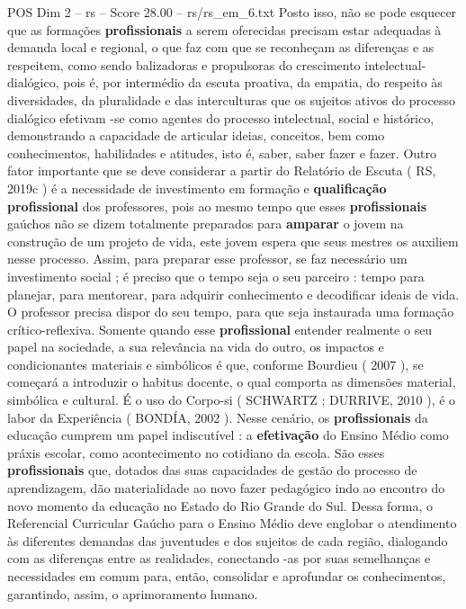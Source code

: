 \begin{textsample}{POS Dim 2 – rs – Score 28.00 – rs/rs\_em\_6.txt}
Posto isso, não se pode esquecer que as formações \textbf{profissionais} a serem oferecidas precisam estar adequadas à demanda local e regional, o que faz com que se reconheçam as diferenças e as respeitem, como sendo balizadoras e propulsoras do crescimento intelectual-dialógico, pois é, por intermédio da escuta proativa, da empatia, do respeito às diversidades, da pluralidade e das interculturas que os sujeitos ativos do processo dialógico efetivam -se como agentes do processo intelectual, social e histórico, demonstrando a capacidade de articular ideias, conceitos, bem como conhecimentos, habilidades e atitudes, isto é, saber, saber fazer e fazer.
Outro fator importante que se deve considerar a partir do Relatório de Escuta ( RS, 2019c ) é a necessidade de investimento em formação e \textbf{qualificação} \textbf{profissional} dos professores, pois ao mesmo tempo que esses \textbf{profissionais} gaúchos não se dizem totalmente preparados para \textbf{amparar} o jovem na construção de um projeto de vida, este jovem espera que seus mestres os auxiliem nesse processo.
Assim, para preparar esse professor, se faz necessário um investimento social ; é preciso que o tempo seja o seu parceiro : tempo para planejar, para mentorear, para adquirir conhecimento e decodificar ideais de vida.
O professor precisa dispor do seu tempo, para que seja instaurada uma formação crítico-reflexiva.
Somente quando esse \textbf{profissional} entender realmente o seu papel na sociedade, a sua relevância na vida do outro, os impactos e condicionantes materiais e simbólicos é que, conforme Bourdieu ( 2007 ), se começará a introduzir o habitus docente, o qual comporta as dimensões material, simbólica e cultural.
É o uso do Corpo-si ( SCHWARTZ ; DURRIVE, 2010 ), é o labor da Experiência ( BONDÍA, 2002 ).
Nesse cenário, os \textbf{profissionais} da educação cumprem um papel indiscutível : a \textbf{efetivação} do Ensino Médio como práxis escolar, como acontecimento no cotidiano da escola.
São esses \textbf{profissionais} que, dotados das suas capacidades de gestão do processo de aprendizagem, dão materialidade ao novo fazer pedagógico indo ao encontro do novo momento da educação no Estado do Rio Grande do Sul.
Dessa forma, o Referencial Curricular Gaúcho para o Ensino Médio deve englobar o atendimento às diferentes demandas das juventudes e dos sujeitos de cada região, dialogando com as diferenças entre as realidades, conectando -as por suas semelhanças e necessidades em comum para, então, consolidar e aprofundar os conhecimentos, garantindo, assim, o aprimoramento humano.

\end{textsample}
